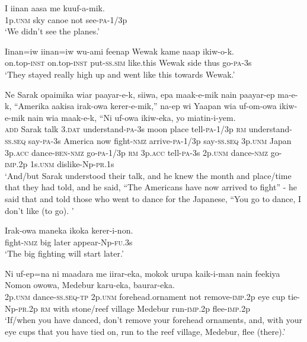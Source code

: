 \ea
\gll  I  iinan  aasa  me  kuuf-a-mik. \\
1p.\textsc{unm}  sky  canoe  not  see-\textsc{pa}-1/3p \\
\glt ‘We didn’t see the planes.’ \\
\z


\ea
\gll  Iinan=iw  iinan=iw  wu-ami  feenap  Wewak  kame naap  ikiw-o-k.\\
on.top-\textsc{inst}  on.top-\textsc{inst}  put-\textsc{ss}.\textsc{sim}  like.this  Wewak  side thus  go-\textsc{pa}-3s \\
\glt ‘They stayed really high up and went like this towards Wewak.’ \\
\z


\ea
\gll  Ne  Sarak  opaimika  wiar  paayar-e-k,  siiwa,  epa  maak-e-mik  nain  paayar-ep  ma-e-k, “Amerika  aakisa  irak-owa  kerer-e-mik,”  na-ep  wi  Yaapan  wia  uf-om-owa  ikiw-e-mik  nain  wia  maak-e-k, “Ni  uf-owa  ikiw-eka,  yo  miatin-i-yem. \\
\textsc{add}  Sarak  talk  3.\textsc{dat}  understand-\textsc{pa}-3s  moon  place  tell-\textsc{pa}-1/3p  \textsc{rm}  understand-\textsc{ss.seq}  say-\textsc{pa}-3s   America  now  fight-\textsc{nmz}  arrive-\textsc{pa}-1/3p  say-\textsc{ss.seq}  3p.\textsc{unm}  Japan  3p.\textsc{acc}  dance-\textsc{ben}-\textsc{nmz}  go-\textsc{pa}-1/3p  \textsc{rm}  3p.\textsc{acc}  tell-\textsc{pa}-3s  2p.\textsc{unm}  dance-\textsc{nmz}  go-\textsc{imp}.2p  1s.\textsc{unm}  dislike-Np-\textsc{pr}.1s \\
\glt ‘And/but Sarak understood their talk, and he knew the month and place/time that they had told, and he said, “The Americans have now arrived to fight” - he said that and told those who went to dance for the Japanese, “You go to dance, I don’t like (to go). ’ \\
\z


\ea
\gll  Irak-owa  maneka  ikoka  kerer-i-non. \\
fight-\textsc{nmz}  big  later  appear-Np-\textsc{fu}.3s \\
\glt ‘The big fighting will start later.’ \\
\z


\ea
\gll  Ni  uf-ep=na  ni  maadara  me iirar-eka,  mokok  urupa  kaik-i-man  nain  feekiya Nomon  owowa,  Medebur  karu-eka,  baurar-eka. \\
2p.\textsc{unm}  dance-\textsc{ss.seq}-\textsc{tp}  2p.\textsc{unm}  forehead.ornament  not remove-\textsc{imp}.2p  eye  cup  tie-Np-\textsc{pr}.2p  \textsc{rm}  with stone/reef  village  Medebur  run-\textsc{imp}.2p  flee-\textsc{imp}.2p \\ 
\glt ‘If/when you have danced, don’t remove your forehead ornaments, and, with your eye cups that you have tied on, run to the reef village, Medebur, flee (there).’ \\
\z


